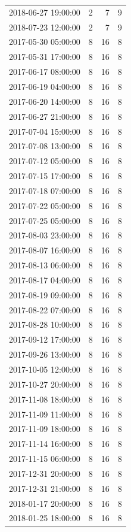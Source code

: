 \begin{tabular}{lrrr}
2018-06-27 19:00:00 & 2 & 7 & 9 \\
2018-07-23 12:00:00 & 2 & 7 & 9 \\
2017-05-30 05:00:00 & 8 & 16 & 8 \\
2017-05-31 17:00:00 & 8 & 16 & 8 \\
2017-06-17 08:00:00 & 8 & 16 & 8 \\
2017-06-19 04:00:00 & 8 & 16 & 8 \\
2017-06-20 14:00:00 & 8 & 16 & 8 \\
2017-06-27 21:00:00 & 8 & 16 & 8 \\
2017-07-04 15:00:00 & 8 & 16 & 8 \\
2017-07-08 13:00:00 & 8 & 16 & 8 \\
2017-07-12 05:00:00 & 8 & 16 & 8 \\
2017-07-15 17:00:00 & 8 & 16 & 8 \\
2017-07-18 07:00:00 & 8 & 16 & 8 \\
2017-07-22 05:00:00 & 8 & 16 & 8 \\
2017-07-25 05:00:00 & 8 & 16 & 8 \\
2017-08-03 23:00:00 & 8 & 16 & 8 \\
2017-08-07 16:00:00 & 8 & 16 & 8 \\
2017-08-13 06:00:00 & 8 & 16 & 8 \\
2017-08-17 04:00:00 & 8 & 16 & 8 \\
2017-08-19 09:00:00 & 8 & 16 & 8 \\
2017-08-22 07:00:00 & 8 & 16 & 8 \\
2017-08-28 10:00:00 & 8 & 16 & 8 \\
2017-09-12 17:00:00 & 8 & 16 & 8 \\
2017-09-26 13:00:00 & 8 & 16 & 8 \\
2017-10-05 12:00:00 & 8 & 16 & 8 \\
2017-10-27 20:00:00 & 8 & 16 & 8 \\
2017-11-08 18:00:00 & 8 & 16 & 8 \\
2017-11-09 11:00:00 & 8 & 16 & 8 \\
2017-11-09 18:00:00 & 8 & 16 & 8 \\
2017-11-14 16:00:00 & 8 & 16 & 8 \\
2017-11-15 06:00:00 & 8 & 16 & 8 \\
2017-12-31 20:00:00 & 8 & 16 & 8 \\
2017-12-31 21:00:00 & 8 & 16 & 8 \\
2018-01-17 20:00:00 & 8 & 16 & 8 \\
2018-01-25 18:00:00 & 8 & 16 & 8 \\

\end{tabular}
